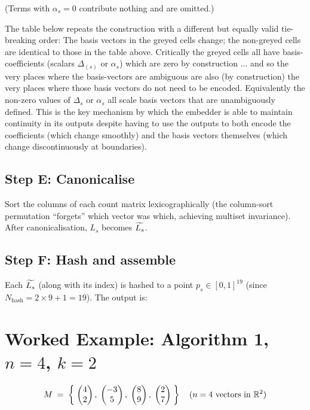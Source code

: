 \noindent
(Terms with $\alpha_s=0$ contribute nothing and are omitted.)

\noindent
The table below repeats the construction with a different but equally valid
tie-breaking order: 
The basis vectors in the greyed cells change; the non-greyed cells
are identical to those in the table above.  Critically the greyed cells all have basis-coefficients
(scalars  $\Delta_{(s)}$ or $\alpha_{s}$) which are zero by construction ... and so
 the very places where the basis-vectors are ambiguous are also (by construction)
  the very places where those basis vectors do not need to be encoded. Equivalently the
   non-zero values of $\Delta_s$ or $\alpha_s$ all scale basis vectors that are unambiguously defined.
    This is the key mechanism by which the embedder is able to maintain continuity in its outputs despite
      having to use the outputs to both encode the coefficients (which change smoothly) and the basis vectors
      themselves (which change discontinuously at boundaries).



\subsection*{Step E: Canonicalise}

Sort the columns of each count matrix lexicographically (the column-sort
permutation ``forgets'' which vector was which, achieving multiset invariance).
After canonicalisation, $L_s$ becomes $\widetilde{L_s}$.

\subsection*{Step F: Hash and assemble}

Each $\widetilde{L_s}$ (along with its index) is hashed to a point $p_s \in
[0,1]^{19}$ (since $N_{\text{hash}} = 2{\times}9{+}1 = 19$).
The output is:


\section{Worked Example: Algorithm 1, $n=4$, $k=2$}
\label{sec:example-alg1}

\[
  M \;=\; \left\{\;
    \begin{pmatrix}4\\2\end{pmatrix},\;
    \begin{pmatrix}-3\\5\end{pmatrix},\;
    \begin{pmatrix}8\\9\end{pmatrix},\;
    \begin{pmatrix}2\\7\end{pmatrix}
  \;\right\}
  \quad (n=4 \text{ vectors in } \mathbb{R}^2)
\]

